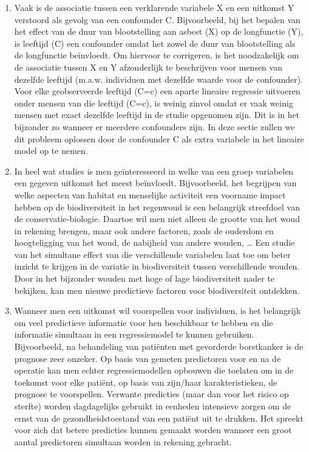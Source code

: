 \documentclass[
  12pt,dutch,coursenotes]{book}
\theoremstyle{definition}
\theoremstyle{definition}
\theoremstyle{definition}
\theoremstyle{definition}
\theoremstyle{remark}
\begin{document}
\begin{enumerate}
\def\labelenumi{\arabic{enumi}.}
\item
  Vaak is de associatie tussen een verklarende variabele X en een uitkomst Y verstoord als gevolg van een confounder C. Bijvoorbeeld, bij het bepalen van het effect van de duur van blootstelling aan asbest (X) op de longfunctie (Y), is leeftijd (C) een confounder omdat het zowel de duur van blootstelling als de longfunctie beïnvloedt. Om hiervoor te corrigeren, is het noodzakelijk om de associatie tussen X en Y afzonderlijk te beschrijven voor mensen van dezelfde leeftijd (m.a.w. individuen met dezelfde waarde voor de confounder). Voor elke geobserveerde leeftijd (C=c) een aparte lineaire regressie uitvoeren onder mensen van die leeftijd (C=c), is weinig zinvol omdat er vaak weinig mensen met exact dezelfde leeftijd in de studie opgenomen zijn. Dit is in het bijzonder zo wanneer er meerdere confounders zijn. In deze sectie zullen we dit probleem oplossen door de confounder C als extra variabele in het lineaire model op te nemen.
\item
  In heel wat studies is men geïnteresseerd in welke van een groep variabelen een gegeven uitkomst het meest beïnvloedt. Bijvoorbeeld, het begrijpen van welke aspecten van habitat en menselijke activiteit een voorname impact hebben op de biodiversiteit in het regenwoud is een belangrijk streefdoel van de conservatie-biologie. Daartoe wil men niet alleen de grootte van het woud in rekening brengen, maar ook andere factoren, zoals de ouderdom en hoogteligging van het woud, de nabijheid van andere wouden, \ldots{} Een studie van het simultane effect van die verschillende variabelen laat toe om beter inzicht te krijgen in de variatie in biodiversiteit tussen verschillende wouden. Door in het bijzonder wouden met hoge of lage biodiversiteit nader te bekijken, kan men nieuwe predictieve factoren voor biodiversiteit ontdekken.
\item
  Wanneer men een uitkomst wil voorspellen voor individuen, is het belangrijk om veel predictieve informatie voor hen beschikbaar te hebben en die informatie simultaan in een regressiemodel te kunnen gebruiken. Bijvoorbeeld, na behandeling van patiënten met gevorderde borstkanker is de prognose zeer onzeker. Op basis van gemeten predictoren voor en na de operatie kan men echter regressiemodellen opbouwen die toelaten om in de toekomst voor elke patiënt, op basis van zijn/haar karakteristieken, de prognose te voorspellen. Verwante predicties (maar dan voor het risico op sterfte) worden dagdagelijks gebruikt in eenheden intensieve zorgen om de ernst van de gezondheidstoestand van een patiënt uit te drukken. Het spreekt voor zich dat betere predicties kunnen gemaakt worden wanneer een groot aantal predictoren simultaan worden in rekening gebracht.
\end{enumerate}
\end{document}

